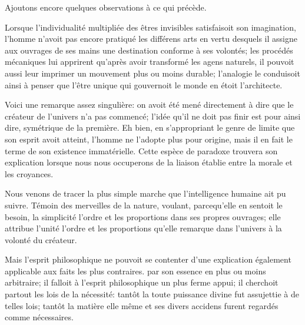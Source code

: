 \documentclass[11pt,a4paper]{article}
\begin{document}
Ajoutons encore quelques observations à ce qui précède.

Lorsque l'individualité multipliée des êtres invisibles satisfaisoit son
imagination, l'homme n'avoit pas encore pratiqué les différens arts en
vertu desquels il assigne aux ouvrages de ses mains une destination
conforme à ses volontés; les procédés mécaniques lui apprirent qu'après
avoir transformé les agens naturels, il pouvoit aussi leur imprimer un
mouvement plus ou moins durable; l'analogie le conduisoit ainsi
 à penser que l'être unique qui gouvernoit le
monde en étoit l'architecte.

Voici une remarque assez singulière: on avoit été mené directement à
dire que le créateur de l'univers n'a pas commencé; l'idée qu'il ne
doit pas finir est pour ainsi dire, symétrique de la première. Eh bien,
en  s'appropriant le genre de limite
que son esprit avoit atteint, l'homme ne l'adopte plus pour origine,
mais il en fait le terme de son existence immatérielle. Cette espèce de
paradoxe  trouvera son explication lorsque nous nous
occuperons de la liaison établie entre la morale et les croyances.

Nous venons de tracer la plus simple marche que l'intelligence humaine
ait pu suivre. Témoin des merveilles de la nature, voulant, parcequ'elle
en sentoit le besoin, la simplicité l'ordre et les proportions dans ses
propres ouvrages; elle attribue  l'unité l'ordre et les
proportions qu'elle remarque dans l'univers à la volonté du créateur.

Mais l'esprit philosophique ne pouvoit se contenter d'une explication
également applicable aux faits les plus contraires.  par son essence  en plus ou moins
arbitraire; il  falloit à l'esprit philosophique un plus
ferme appui; il cherchoit partout les lois de la nécessité: tantôt la
toute puissance divine fut assujettie à de telles lois; tantôt la
matière elle même et ses divers accidens furent regardés comme
nécessaires. 
\end{document}
